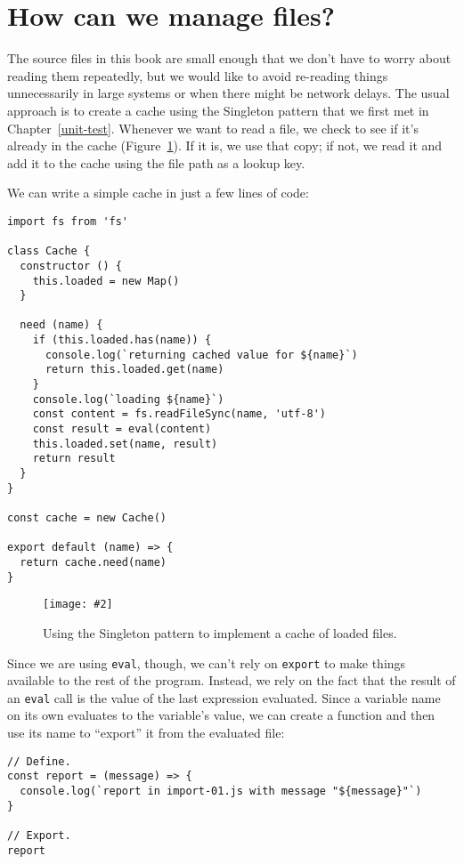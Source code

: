 \documentclass[krantzl]{krantz}
\newcommand{\figpdfhere}[4]{\begin{figure}[h]%
\centering%
\texttt{[image: \#2]}%
\caption{#3}%
\label{#1}%
\end{figure}}
\newcommand{\chapref}[1]{Chapter~\ref{#1}}
\newcommand{\figref}[1]{Figure~\ref{#1}}
\begin{document}
\section{How can we manage files?}\label{file-interpolator-manage}


The source files in this book are small enough
that we don’t have to worry about reading them repeatedly,
but we would like to avoid re-reading things unnecessarily
in large systems or when there might be network delays.
The usual approach is to create a cache
using the Singleton pattern
that we first met in \chapref{unit-test}.
Whenever we want to read a file,
we check to see if it’s already in the cache
(\figref{file-interpolator-cache}).
If it is,
we use that copy;
if not,
we read it and add it to the cache
using the file path as a lookup key.


We can write a simple cache in just a few lines of code:


\begin{lstlisting}[frame=tblr]
import fs from 'fs'

class Cache {
  constructor () {
    this.loaded = new Map()
  }

  need (name) {
    if (this.loaded.has(name)) {
      console.log(`returning cached value for ${name}`)
      return this.loaded.get(name)
    }
    console.log(`loading ${name}`)
    const content = fs.readFileSync(name, 'utf-8')
    const result = eval(content)
    this.loaded.set(name, result)
    return result
  }
}

const cache = new Cache()

export default (name) => {
  return cache.need(name)
}
\end{lstlisting}


\figpdfhere{file-interpolator-cache}{./file-interpolator/cache.pdf}{Using the Singleton pattern to implement a cache of loaded files.}{0.6}


Since we are using \texttt{eval}, though,
we can’t rely on \texttt{export} to make things available to the rest of the program.
Instead,
we rely on the fact that the result of an \texttt{eval} call is the value of
the last expression evaluated.
Since a variable name on its own evaluates to the variable’s value,
we can create a function and then use its name
to “export” it from the evaluated file:


\begin{lstlisting}[frame=tblr]
// Define.
const report = (message) => {
  console.log(`report in import-01.js with message "${message}"`)
}

// Export.
report
\end{lstlisting}
\end{document}
